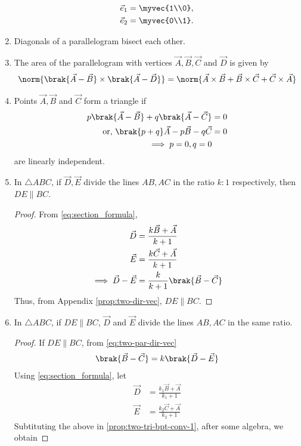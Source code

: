 \begin{enumerate}[label=\thesection.\arabic*.,ref=\thesection.\theenumi]
  \begin{align}
  \vec{e}_1&= \myvec{1\\0}, 
  \\
  \vec{e}_2&= \myvec{0\\1}.
  \end{align}
  \item Diagonals of a parallelogram bisect each other.
	  \label{prop:two-pgm-diag-bisect}
\item The area of the parallelogram with vertices $\vec{A}, \vec{B}, \vec{C}$ and $\vec{D}$ is given by 
  \label{prop:pgm2d}
\begin{align}
  \label{eq:pgm2d}
	\norm{\brak{\vec{A}-\vec{B}} \times \brak{\vec{A}-\vec{D}}}
 = 
 \norm{\vec{A} \times \vec{B}+\vec{B} \times \vec{C}+\vec{C} \times \vec{A}}
  \end{align}
  \item Points $\vec{A},\vec{B}$ and $\vec{C}$ form a triangle  if 
	  \label{prop:two-tri-indep}
  \begin{align}
	  p\brak{\vec{A}- \vec{B}} +q\brak{\vec{A} -\vec{C}} &= 0
	  \\
	  \label{eq:two-tri-indep}
	  \text{or, }\brak{p+q}\vec{A}- p\vec{B} -q\vec{C} &= 0
	  \\
	  \implies p=0, q=0
  \end{align}
  are linearly independent.
  \item In $\triangle ABC$, if $\vec{D}, \vec{E}$ divide the lines $AB, AC$ in the ratio $k:1$ respectively,  then $DE \parallel BC$.
	  \label{prop:two-tri-bpt}
	  \begin{proof}
		  From 
	  \eqref{eq:section_formula}, 
  \begin{align}
	  \vec{D}&= \frac{k\vec{B}+ \vec{A}}{k+1}
	  \\
	  \vec{E}&= \frac{k\vec{C}+ \vec{A}}{k+1}
	  \\
	  \implies 
	  \vec{D}-	  \vec{E}&= \frac{k}{k+1}\brak{\vec{B}- \vec{C}}
  \end{align}
  Thus, from 
		  Appendix \ref{prop:two-dir-vec}, $DE \parallel BC$.

	  \end{proof}

  \item In $\triangle ABC$, if $DE \parallel BC$, $\vec{D}$ and $\vec{E}$ divide the lines $AB, AC$ in the same ratio.  
	  \label{prop:two-tri-bpt-conv}
	  \begin{proof}
If $DE \parallel BC$,
		  from 
 \eqref{eq:two-par-dir-vec}
  \begin{align}
	  \label{prop:two-tri-bpt-conv-1}
	  \brak{\vec{B}- \vec{C}} = k\brak{\vec{D}-	  \vec{E}}
  \end{align}
Using   
	  \eqref{eq:section_formula}, 
let 
  \begin{align}
	  \vec{D}&= \frac{k_1\vec{B}+ \vec{A}}{k_1+1}
	  \\
	  \vec{E}&= \frac{k_2\vec{C}+ \vec{A}}{k_2+1}
  \end{align}
	  Subtituting the above in 
	  \eqref{prop:two-tri-bpt-conv-1}, after some algebra, we obtain 
	

\end{proof}
\end{enumerate}
